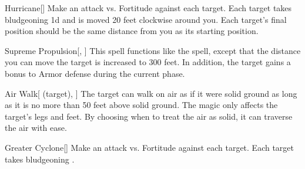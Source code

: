 \lowercase{\hypertarget{spell:Hurricane}{}}\label{spell:Hurricane}
\begin{freeability}[\nth{4}]{\hypertarget{spell:Hurricane}{Hurricane}}[]
Make an attack vs. Fortitude against each target.
\hit Each target takes bludgeoning  \minus1d and is moved 20 feet clockwise around you.
Each target's final position should be the same distance from you as its starting position.
\end{freeability}
\vspace{0.25em}



\lowercase{\hypertarget{spell:Supreme Propulsion}{}}\label{spell:Supreme Propulsion}
\begin{freeability}[\nth{4}]{\hypertarget{spell:Supreme Propulsion}{Supreme Propulsion}}[, ]
This spell functions like the  spell, except that the distance you can move the target is increased to 300 feet.
In addition, the target gains a  bonus to Armor defense during the current phase.
\end{freeability}
\vspace{0.25em}



\lowercase{\hypertarget{spell:Air Walk}{}}\label{spell:Air Walk}
\begin{attuneability}[\nth{5}]{\hypertarget{spell:Air Walk}{Air Walk}}[ (target), ]
The target can walk on air as if it were solid ground as long as it is no more than 50 feet above solid ground.
The magic only affects the target's legs and feet.
By choosing when to treat the air as solid, it can traverse the air with ease.
\end{attuneability}
\vspace{0.25em}



\lowercase{\hypertarget{spell:Greater Cyclone}{}}\label{spell:Greater Cyclone}
\begin{freeability}[\nth{5}]{\hypertarget{spell:Greater Cyclone}{Greater Cyclone}}[]
Make an attack vs. Fortitude against each target.
\hit Each target takes bludgeoning .
\end{freeability}
\vspace{0.25em}



